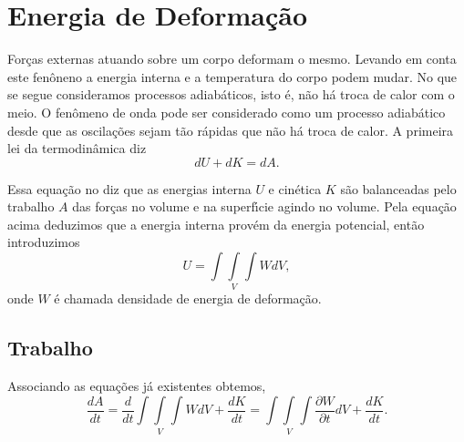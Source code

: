 %

\section{Energia de Deforma\c{c}\~ao}


For\c{c}as externas atuando sobre um corpo deformam o mesmo. Levando em conta este fen\^oneno a energia interna
e a temperatura do corpo podem mudar. No que se segue consideramos processos adiab\'aticos, isto \'e, n\~ao h\'a troca
 de calor com o meio. O fen\^omeno de onda pode ser considerado como um processo adiab\'atico desde que as oscila\c{c}\~oes
sejam t\~ao r\'apidas que n\~ao h\'a troca de calor. A primeira lei da termodin\^amica diz
\[  dU+dK=dA. \]

Essa equa\c{c}\~ao no diz que as energias interna $U$ e cin\'etica $K$ s\~ao balanceadas pelo trabalho $A$ das for\c{c}as no volume e na superf\'\i cie
agindo no volume. Pela equa\c{c}\~ao acima deduzimos que a energia interna prov\'em da energia potencial, ent\~ao introduzimos
\[ U=\int \! \!\int\limits_{V} \! \!\int W dV,\]
onde $W$ \'e chamada densidade de energia de deforma\c{c}\~ao.

\subsection{Trabalho}

Associando as equa\c{c}\~oes j\'a existentes obtemos,
\[ \frac{dA}{dt}=\frac{d}{dt}\int \! \!\int\limits_{V} \! \!\int W dV+\frac{dK}{dt}=\int \! \!\int\limits_{V} \! \!\int \frac{\partial W}{\partial t} dV+\frac{dK}{dt}.\]

